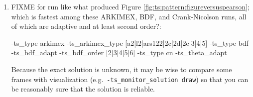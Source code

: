 \begin{enumerate}
\item \label{exer:ts:patternperformancestudy} FIXME for run like what produced Figure \ref{fig:ts:pattern:figureversuspearson}; which is fastest among these ARKIMEX, BDF, and Crank-Nicolson runs, all of which are adaptive and at least second order?:
\begin{code}
-ts_type arkimex -ts_arkimex_type [a2|l2|ars122|2c|2d|2e|3|4|5]
-ts_type bdf -ts_bdf_adapt -ts_bdf_order [2|3|4|5|6]
-ts_type cn -ts_theta_adapt
\end{code}
Because the exact solution is unknown, it may be wise to compare some frames with visualization (e.g.~\texttt{-ts\_monitor\_solution draw}) so that you can be reasonably sure that the solution is reliable.


\end{enumerate}
